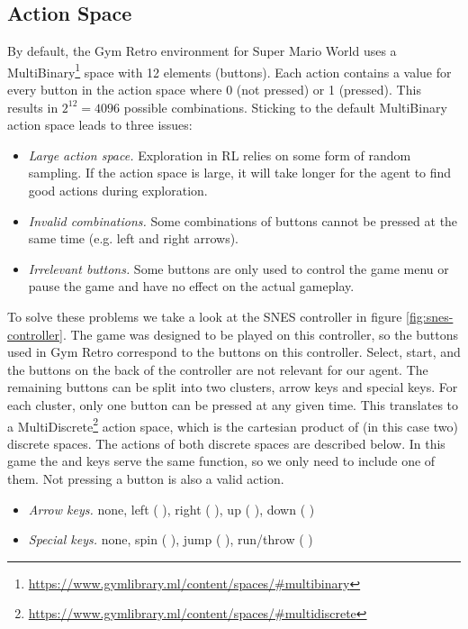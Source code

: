 \documentclass[11pt,a4paper]{article}
\newcommand*{\img}[1]{%
    \raisebox{-.25\baselineskip}{%
        \texttt{[image: \#1]}%
    }%
}
\begin{document}
\subsection{Action Space}
By default, the Gym Retro environment for Super Mario World uses a MultiBinary\footnote{\url{https://www.gymlibrary.ml/content/spaces/\#multibinary}} space with 12 elements (buttons).
Each action contains a value for every button in the action space where 0 (not pressed) or 1 (pressed). This results in $2^{12}=4096$ possible combinations.
Sticking to the default MultiBinary action space leads to three issues:
\begin{itemize}
    \item \emph{Large action space.}
        Exploration in RL relies on some form of random sampling.
        If the action space is large, it will take longer for the agent to find good actions during exploration.
    \item \emph{Invalid combinations.}
        Some combinations of buttons cannot be pressed at the same time (e.g. left and right arrows).
    \item \emph{Irrelevant buttons.} Some buttons are only used to control the game menu or pause the game and have no effect on the actual gameplay.
\end{itemize}
To solve these problems we take a look at the SNES controller in figure \ref{fig:snes-controller}.
The game was designed to be played on this controller, so the buttons used in Gym Retro correspond to the buttons on this controller.
Select, start, and the buttons on the back of the controller are not relevant for our agent.
The remaining buttons can be split into two clusters, arrow keys and special keys.
For each cluster, only one button can be pressed at any given time.
This translates to a MultiDiscrete\footnote{\url{https://www.gymlibrary.ml/content/spaces/\#multidiscrete}} action space, which is the cartesian product of (in this case two) discrete spaces.
The actions of both discrete spaces are described below.
In this game the \img{SuperNintendo-Button-X} and \img{SuperNintendo-Button-Y} keys serve the same function, so we only need to include one of them.
Not pressing a button is also a valid action.
\begin{itemize}
    \item \emph{Arrow keys.} none, left (\img{SuperNintendo-Dpad-Left}), right (\img{SuperNintendo-Dpad-Right}), up (\img{SuperNintendo-Dpad-Up}), down (\img{SuperNintendo-Dpad-Down})
    \item \emph{Special keys.} none, spin (\img{SuperNintendo-Button-A}), jump (\img{SuperNintendo-Button-B}), run/throw (\img{SuperNintendo-Button-X})
\end{itemize}
\end{document}
